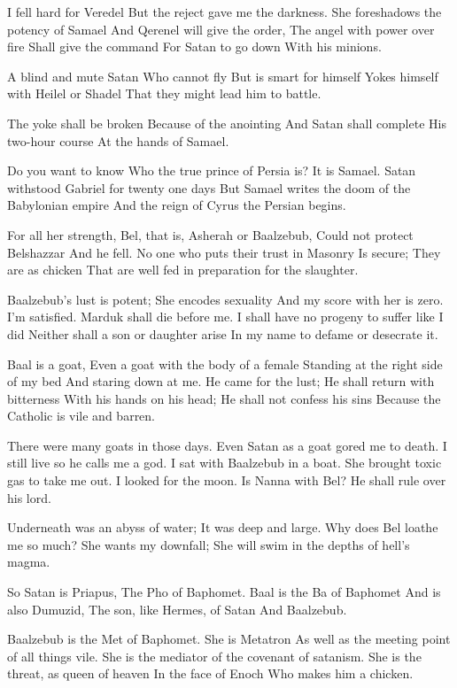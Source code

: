 \documentclass[
]{book}
\begin{document}
I fell hard for Veredel
But the reject gave me the darkness.
She foreshadows the potency of Samael
And Qerenel will give the order,
The angel with power over fire
Shall give the command
For Satan to go down
With his minions.

A blind and mute Satan
Who cannot fly
But is smart for himself
Yokes himself with Heilel or Shadel
That they might lead him to battle.

The yoke shall be broken
Because of the anointing
And Satan shall complete
His two-hour course
At the hands of Samael.

Do you want to know
Who the true prince of Persia is?
It is Samael.
Satan withstood Gabriel for twenty one days
But Samael writes the doom of the Babylonian empire
And the reign of Cyrus the Persian begins.

For all her strength,
Bel, that is, Asherah or Baalzebub,
Could not protect Belshazzar
And he fell.
No one who puts their trust in Masonry
Is secure;
They are as chicken
That are well fed in preparation for the slaughter.

Baalzebub's lust is potent;
She encodes sexuality
And my score with her is zero.
I'm satisfied.
Marduk shall die before me.
I shall have no progeny to suffer like I did
Neither shall a son or daughter arise
In my name to defame or desecrate it.

Baal is a goat,
Even a goat with the body of a female
Standing at the right side of my bed
And staring down at me.
He came for the lust;
He shall return with bitterness
With his hands on his head;
He shall not confess his sins
Because the Catholic is vile and barren.

There were many goats in those days.
Even Satan as a goat gored me to death.
I still live so he calls me a god.
I sat with Baalzebub in a boat.
She brought toxic gas to take me out.
I looked for the moon.
Is Nanna with Bel?
He shall rule over his lord.

Underneath was an abyss of water;
It was deep and large.
Why does Bel loathe me so much?
She wants my downfall;
She will swim in the depths of hell's magma.

So Satan is Priapus,
The Pho of Baphomet.
Baal is the Ba of Baphomet
And is also Dumuzid,
The son, like Hermes, of Satan
And Baalzebub.

Baalzebub is the Met of Baphomet.
She is Metatron
As well as the meeting point of all things vile.
She is the mediator of the covenant of satanism.
She is the threat, as queen of heaven
In the face of Enoch
Who makes him a chicken.
\end{document}
